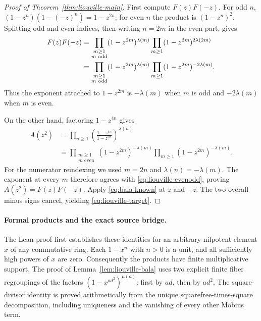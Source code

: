 \documentclass[11pt]{article}
\begin{document}
\begin{proof}[Proof of Theorem~\ref{thm:liouville-main}]
First compute $F(z)F(-z)$. For odd $n$,
$(1-z^n)(1-(-z)^n)=1-z^{2n}$; for even $n$ the product is
$(1-z^n)^2$. Splitting odd and even indices, then writing $n=2m$ in
the even part, gives
\begin{align}
 F(z)F(-z)
 &=\prod_{\substack{m\ge1\\m\text{ odd}}}
       (1-z^{2m})^{\lambda(m)}
   \prod_{m\ge1}(1-z^{2m})^{2\lambda(2m)}\notag\\
 &=\prod_{\substack{m\ge1\\m\text{ odd}}}
       (1-z^{2m})^{\lambda(m)}
   \prod_{m\ge1}(1-z^{2m})^{-2\lambda(m)}.
   \label{eq:liouville-evenodd}
\end{align}
Thus the exponent attached to $1-z^{2m}$ is $-\lambda(m)$ when
$m$ is odd and $-2\lambda(m)$ when $m$ is even.

On the other hand, factoring $1-z^{4n}$ gives
\begin{align*}
 A(z^2)
 &=\prod_{n\ge1}
       \left(\frac{1-z^{4n}}{1-z^{2n}}\right)^{\lambda(n)}\\
 &=\prod_{\substack{m\ge1\\m\text{ even}}}
       (1-z^{2m})^{-\lambda(m)}
   \prod_{m\ge1}(1-z^{2m})^{-\lambda(m)}.
\end{align*}
For the numerator reindexing we used $m=2n$ and
$\lambda(n)=-\lambda(m)$. The exponent at every $m$ therefore
agrees with \eqref{eq:liouville-evenodd}, proving
$A(z^2)=F(z)F(-z)$. Apply \eqref{eq:bala-known} at $z$ and $-z$.
The two overall minus signs cancel, yielding
\eqref{eq:liouville-target}.
\end{proof}

\paragraph{Formal products and the exact source bridge.}
The Lean proof first establishes these identities for an arbitrary
nilpotent element $x$ of any commutative ring. Each $1-x^n$ with $n>0$
is a unit, and all sufficiently high powers of $x$ are zero. Consequently
the products have finite multiplicative support. The proof of
Lemma~\ref{lem:liouville-bala} uses two explicit finite fiber regroupings
of the factors $(1-x^{ad^2})^{\mu(a)}$: first by $ad$, then by $ad^2$.
The square-divisor identity is proved arithmetically from the unique
squarefree-times-square decomposition, including uniqueness and the
vanishing of every other M\"obius term.
\end{document}
